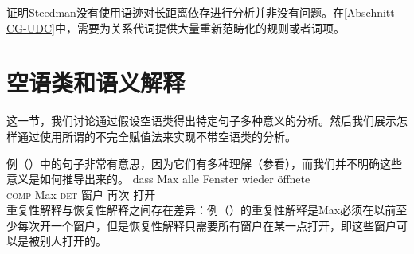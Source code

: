  \citet{Pollard88a}证明Steedman没有使用语迹对长距离依存进行分析并非没有问题。在\ref{Abschnitt-CG-UDC}中，需要为关系代词提供大量重新范畴化的规则或者词项。

\section{空语类和语义解释}
\label{Abschnitt-leere-Elemente-Semantik}
\label{sec-MRS-wieder}

这一节，我们讨论通过假设空语类得出特定句子多种意义的分析。然后我们展示怎样通过使用所谓的不完全赋值法来实现不带空语类的分析。

例（）中的句子非常有意思，因为它们有多种理解（参看\citealp[\S~5.6]{Dowty79a}），而我们并不明确这些意义是如何推导出来的。
\ea
\label{ex-alle-wieder}
\gll dass Max alle Fenster wieder öffnete\\
	 \textsc{comp} Max \textsc{det} 窗户 再次 打开\\
\z
重复性解释与恢复性解释之间存在差异：例（）的重复性解释是Max必须在以前至少每次开一个窗户，但是恢复性解释只需要所有窗户在某一点打开，即这些窗户可以是被别人打开的。

